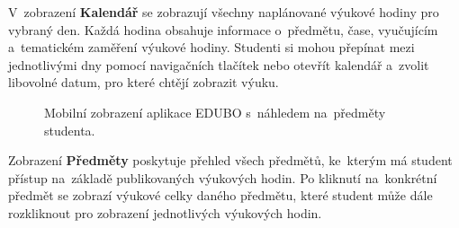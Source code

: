 \documentclass[male,czech,api_bc]{kitheses}
\begin{document}
V~zobrazení \textbf{Kalendář} se zobrazují všechny naplánované výukové hodiny pro vybraný den. Každá hodina obsahuje informace o~předmětu, čase, vyučujícím a~tematickém zaměření výukové hodiny. Studenti si mohou přepínat mezi jednotlivými dny pomocí navigačních tlačítek nebo otevřít kalendář a~zvolit libovolné datum, pro které chtějí zobrazit výuku.

\begin{figure}[H]
	\centering
	\caption{Mobilní zobrazení aplikace EDUBO s~náhledem na~předměty studenta.}
	\label{fig:edubo-6}
\end{figure}

Zobrazení \textbf{Předměty} poskytuje přehled všech předmětů, ke~kterým má student přístup na~základě publikovaných výukových hodin. Po kliknutí na~konkrétní předmět se zobrazí výukové celky daného předmětu, které student může dále rozkliknout pro zobrazení jednotlivých výukových hodin.
\end{document}
